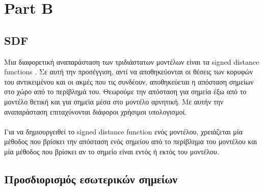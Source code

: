 \documentclass{report}
\begin{document}
\chapter{Part B}

\section{SDF}
Μια διαφορετική αναπαράσταση των τριδιάστατων μοντέλων είναι τα signed distance functions \cite{signed-distance-function}.
Σε αυτή την προσέγγιση, αντί να αποθηκεύονται οι θέσεις των κορυφών του αντικειμένου και οι ακμές που τις συνδέουν, 
αποθηκεύεται η απόσταση σημείων στο χώρο από το περίβλημά του. Θεωρούμε την απόσταση για σημεία έξω από το μοντέλο θετική
και για σημεία μέσα στο μοντέλο αρνητική. Με αυτήν την αναπαράσταση επιταχύνονται διάφοροι χρήσιμοι υπολογισμοί.
\\\\
Για να δημιουργειθεί το signed distance function ενός μοντέλου, χρειάζεται μία μέθοδος που βρίσκει την απόσταση
ενός σημείου από το περίβλημα του μοντέλου και μία μέθοδος που βρίσκει αν το σημείο είναι εντός ή εκτός του μοντέλου.


\section{Προσδιορισμός εσωτερικών σημείων}



\clearpage
{}
\end{document}
